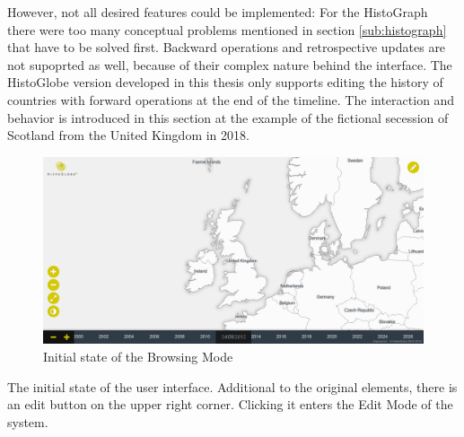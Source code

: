 However, not all desired features could be implemented: For the HistoGraph there were too many conceptual problems mentioned in section \ref{sub:histograph} that have to be solved first. Backward operations and retrospective updates are not supoprted as well, because of their complex nature behind the interface. The HistoGlobe version developed in this thesis only supports editing the history of countries with forward operations at the end of the timeline. The interaction and behavior is introduced in this section at the example of the fictional secession of Scotland from the United Kingdom in 2018.

\newpage
\begin{minipage}[t]{0.47\textwidth}

  \begin{figure}[H]
    \centering
    \includegraphics[width=1.0\textwidth]{graphics/development/user_interface_design_process/1_init.png}
    \caption{Initial state of the Browsing Mode}
    \label{fig:final_1_init}
  \end{figure}

  The initial state of the user interface. Additional to the original elements, there is an edit button on the upper right corner. Clicking it enters the Edit Mode of the system.

\end{minipage}    %
\hspace{1.5em}    %
